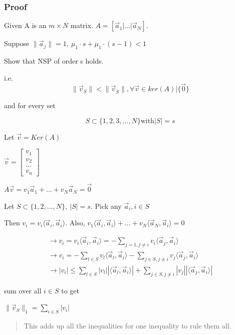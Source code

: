 \documentclass[11pt]{article}
\begin{document}
\subsubsection{Proof}
\label{sec:org143809a}

Given A is an \(m \times N\) matrix. \(A = [\vec a_1 | ... | \vec a_N]\).

Suppose \(\|\vec a_j\| = 1, \ \mu_1 \cdot s + \mu_1 \cdot (s - 1) < 1\)

Show that NSP of order s holds.

i.e.
$$
\|\vec v_S \| < \| \vec v_{\bar S}\|, \forall \vec v \in ker(A)| \{\vec 0\}
$$

and for every set

$$
S \subset \{1,2,3,...,N\} \text{with} |S| = s
$$

Let \(\vec v = Ker(A)\)

\(\vec v = \begin{bmatrix} v_1\\ v_2\\ ...\\ v_n \end{bmatrix}\)

\(A \vec v = v_1 \vec a_1 + ... + v_N \vec a_N = \vec 0\)

Let \(S \subset \{1,2,...,N\}, \ |S| = s\). Pick any \(\vec a_i, i \in S\)

Then \(v_i = v_i \langle \vec a_i, \vec a_i \rangle\). Also, \(v_1 \langle \vec a_i, \vec a_i \rangle + ... + v_N \langle \vec a_N, \vec a_i \rangle = 0\)

\begin{equation}
\begin{split}
\to v_i = v_i \langle \vec a_i, \vec a_i \rangle = - \sum_{j = 1, j \neq i}^{}  v_i \langle \vec a_j, \vec a_i \rangle\\
\to v_i = - \sum_{l \in S}^{} v_l \langle \vec a_l, \vec a_i \rangle - \sum_{j \in S, j \neq i}^{} v_j \langle \vec a_j, \vec a_i \rangle\\
\to |v_i| \leq \sum_{l \in S}^{} |v_l| |\langle \vec a_l, \vec a_i \rangle| + \sum_{j \in S, j \neq i}^{} |v_j| |\langle \vec a_j, \vec a_i \rangle|
\end{split}
\end{equation}

sum over all \(i \in S\) to get

\(\|\vec v_S\|_1 = \sum_{i \in S}^{} |v_i|\)

\begin{quote}
This adds up all the inequalities for one inequality to rule them all.
\end{quote}
\end{document}
